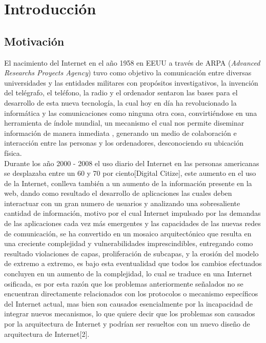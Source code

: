 \documentclass[12pt]{ociamthesis}  %
\begin{document}
\begin{romanpages}          %
\tableofcontents            %
\listoffigures              %
\end{romanpages}            %

\chapter{Introducción}
\section{Motivación}

El nacimiento del Internet en el año 1958 en EEUU a través de ARPA (\textit{Advanced Researchs Proyects Agency}) tuvo como objetivo la comunicación entre diversas universidades y las entidades militares con propósitos investigativos, la invención del telégrafo, el teléfono, la radio y el ordenador sentaron las bases para el desarrollo de esta nueva tecnología, la cual hoy en día ha revolucionado la informática y las comunicaciones como ninguna otra cosa, convirtiéndose en una herramienta de índole mundial, un mecanismo el cual nos permite diseminar información de manera inmediata , generando un medio de colaboración e interacción entre las personas y los ordenadores, desconociendo su ubicación física.\\

Durante los año 2000 - 2008 el uso diario del Internet en las personas americanas se desplazaba entre un 60 y 70 por ciento[Digital Citize], este aumento en el uso de la Internet, conlleva también a un aumento de la información presente en la web, dando como resultado el desarrollo de aplicaciones las cuales deben interactuar con un gran numero de usuarios y analizando una sobresaliente cantidad de información, motivo por el cual Internet impulsado por las demandas de las aplicaciones cada vez más emergentes y las capacidades de las nuevas redes de comunicación, se ha convertido en un mosaico arquitectónico que resulta en una creciente complejidad y vulnerabilidades imprescindibles, entregando como resultado violaciones de capas, proliferación de subcapas, y la erosión del modelo de extremo a extremo, es bajo esta eventualidad que todos los cambios efectuados concluyen en un aumento de la complejidad, lo cual se traduce en una Internet osificada, es por esta razón que los problemas anteriormente señalados no se encuentran directamente relacionados con los protocolos o mecanismo específicos del Internet actual, mas bien son causados esencialmente por la incapacidad de integrar nuevos mecanismos, lo que quiere decir que los problemas son causados por la arquitectura de Internet y podrían ser resueltos con un nuevo diseño de arquitectura de Internet[2].\\
\end{document}
